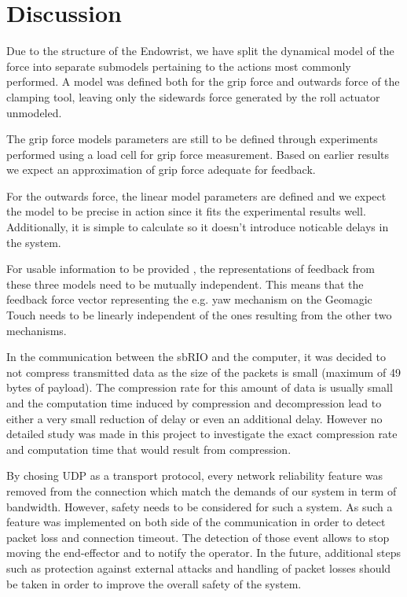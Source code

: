 \section{Discussion}
Due to the structure of the Endowrist, we have split the dynamical model of the force into separate submodels pertaining to the actions most commonly performed.
A model was defined both for the grip force and outwards force of the clamping tool, leaving only the sidewards force generated by the roll actuator unmodeled.

The grip force models parameters are still to be defined through experiments performed using a load cell for grip force measurement.
Based on earlier results \cite{kim2014dynamic} we expect an approximation of grip force adequate for feedback.

For the outwards force, the linear model parameters are defined and we expect the model to be precise in action since it fits the experimental results well.
Additionally, it is simple to calculate so it doesn't introduce noticable delays in the system.

For usable information to be provided , the representations of feedback from these three models need to be mutually independent.
This means that the feedback force vector representing the e.g. yaw mechanism on the Geomagic Touch needs to be linearly independent of the ones resulting from the other two mechanisms.


In the communication between the sbRIO and the computer, it was decided to not compress transmitted data as the size of the packets is small (maximum of 49 bytes of payload). The compression rate for this amount of data is usually small and the computation time induced by compression and decompression lead to either a very small reduction of delay or even an additional delay. However no detailed study was made in this project to investigate the exact compression rate and computation time that would result from compression.

By chosing UDP as a transport protocol, every network reliability feature was removed from the connection which match the demands of our system in term of bandwidth. However, safety needs to be considered for such a system. As such a feature was implemented on both side of the communication in order to detect packet loss and connection timeout. The detection of those event allows to stop moving the end-effector and to notify the operator. In the future, additional steps such as protection against external attacks and handling of packet losses should be taken in order to improve the overall safety of the system.
